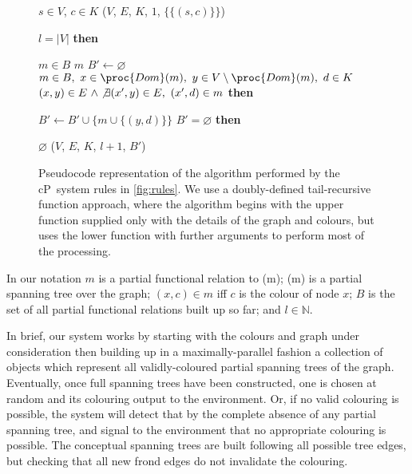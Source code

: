 \renewcommand{\isequal}{=}
\renewcommand{\gets}{\leftarrow}
\renewcommand{\Then}{\textbf{then}\addtocounter{indent}{1}}

\begin{figure}
\begin{framed}
\begin{codebox}
\li {} \(s \in V\), \(c \in K\)
\li {}  (\(V\), \(E\), \(K\), \(1\), \(\{\{(s, c)\}\}\))   \label{li:endofsmaller}
\end{codebox}
\hrulefill
\begin{codebox}
\li \If \(l \isequal |V|\) \Then  \label{li:iflgreaterthanv}
    \li {} \(m \in B\)
    \li {} \(m\)    \label{li:returnsuccess}
\End
\li \(B' \gets \varnothing\)
\li \Parfor \(m \in B,~x \in \proc{Dom}(m),~y \in V \setminus \proc{Dom}(m),~ d \in K \)    \label{li:makebstart}
\li \Do
    \If \((x,y) \in E ~ \land \not\exists(x',y) \in E,~(x',d) \in m\) \Then
        \li \(B' \gets B' \cup \{m \cup \{ (y,d) \} \}\)   \label{li:makebfinish}
    \End
\End
\li \If \(B' \isequal \varnothing\) \Then \label{li:fail1}
        \li {} \(\varnothing\)  \label{li:fail2}
    \li \Else
          (\(V\), \(E\), \(K\), \(l + 1\), \(B'\))\label{li:recurse}
\End
\end{codebox}
\end{framed}
\caption{\label{code:graphcol}Pseudocode representation of the algorithm performed by the cP~system rules in \autoref{fig:rules}.  We use a doubly-defined tail-recursive function approach, where the algorithm begins with the upper function supplied only with the details of the graph and colours, but uses the lower function with further arguments to perform most of the processing.}
\end{figure}

In our notation \(m\) is a partial functional relation to (m); (m) is a partial spanning tree over the graph; \((x, c) \in m\) iff \(c\) is the colour of node \(x\);  \(B\) is the set of all partial functional relations built up so far; and \(l \in \mathbb{N}\).

In brief, our system works by starting with the colours and graph under consideration then building up in a maximally-parallel fashion a collection of objects which represent all validly-coloured partial spanning trees of the graph.  Eventually, once full spanning trees have been constructed, one is chosen at random and its colouring output to the environment.  Or, if no valid colouring is possible, the system will detect that by the complete absence of any partial spanning tree, and signal to the environment that no appropriate colouring is possible.  The conceptual spanning trees are built following all possible tree edges, but checking that all new frond edges do not invalidate the colouring.

